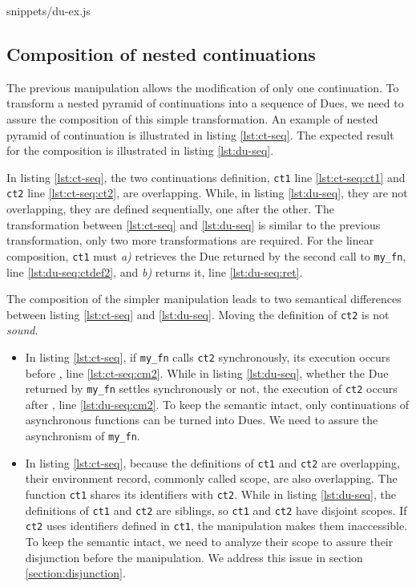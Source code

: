              {snippets/du-ex.js}

\subsection{Composition of nested continuations} \label{section:overlapping-continuations}

The previous manipulation allows the modification of only one continuation.
To transform a nested pyramid of continuations into a sequence of Dues, we need to assure the composition of this simple transformation.
An example of nested pyramid of continuation is illustrated in listing \ref{lst:ct-seq}.
The expected result for the composition is illustrated in listing \ref{lst:du-seq}.

In listing \ref{lst:ct-seq}, the two continuations definition, \texttt{ct1} line \ref{lst:ct-seq:ct1} and \texttt{ct2} line \ref{lst:ct-seq:ct2}, are overlapping.
While, in listing \ref{lst:du-seq}, they are not overlapping, they are defined sequentially, one after the other.
The transformation between \ref{lst:ct-seq} and \ref{lst:du-seq} is similar to the previous transformation, only two more transformations are required.
For the linear composition, \texttt{ct1} must \textit{a)} retrieves the Due returned by the second call to \texttt{my_fn}, line \ref{lst:du-seq:ctdef2}, and \textit{b)} returns it, line \ref{lst:du-seq:ret}.

The composition of the simpler manipulation leads to two semantical differences between listing \ref{lst:ct-seq} and \ref{lst:du-seq}.
Moving the definition of \texttt{ct2} is not \textit{sound}.
\begin{itemize}
  \item In listing \ref{lst:ct-seq}, if \texttt{my\_fn} calls \texttt{ct2} synchronously, its execution occurs before , line \ref{lst:ct-seq:cm2}.
  While in listing \ref{lst:du-seq}, whether the Due returned by \texttt{my\_fn} settles synchronously or not, the execution of \texttt{ct2} occurs after , line \ref{lst:du-seq:cm2}.
  To keep the semantic intact, only continuations of asynchronous functions can be turned into Dues.
  We need to assure the asynchronism of \texttt{my\_fn}.
  \item In listing \ref{lst:ct-seq}, because the definitions of \texttt{ct1} and \texttt{ct2} are overlapping, their environment record, commonly called scope, are also overlapping.
  The function \texttt{ct1} shares its identifiers with \texttt{ct2}.
  While in listing \ref{lst:du-seq}, the definitions of \texttt{ct1} and \texttt{ct2} are siblings, so \texttt{ct1} and \texttt{ct2} have disjoint scopes.
  If \texttt{ct2} uses identifiers defined in \texttt{ct1}, the manipulation makes them inaccessible.
  To keep the semantic intact, we need to analyze their scope to assure their disjunction before the manipulation. 
  We address this issue in section \ref{section:disjunction}.
\end{itemize}

